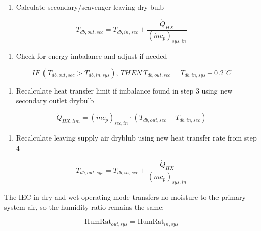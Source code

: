 \begin{enumerate}
\def\labelenumi{\arabic{enumi}.}
\setcounter{enumi}{1}
\tightlist
\item
  Calculate secondary/scavenger leaving dry-bulb
\end{enumerate}

\begin{equation}
T_{db,out,sec} = T_{db,in,sec} + \frac{\dot{Q}_{HX}}{ \left(\dot{m}c_{p}\right)_{sys,in}}
\end{equation}

\begin{enumerate}
\def\labelenumi{\arabic{enumi}.}
\setcounter{enumi}{2}
\tightlist
\item
  Check for energy imbalance and adjust if needed
\end{enumerate}

\begin{equation}
IF~\left(T_{db,out,sec}>T_{db,in,sys}\right),~THEN~T_{db,out,sec} = T_{db,in,sys}-0.2^{\circ}C
\end{equation}

\begin{enumerate}
\def\labelenumi{\arabic{enumi}.}
\setcounter{enumi}{3}
\tightlist
\item
  Recalculate heat transfer limit if imbalance found in step 3 using new secondary outlet drybulb
\end{enumerate}

\begin{equation}
\dot{Q}_{HX,lim} = \left(\dot{m}c_{p}\right)_{sec,in}\cdot \left( T_{db,out,sec}-T_{db,in,sec} \right)
\end{equation}

\begin{enumerate}
\def\labelenumi{\arabic{enumi}.}
\setcounter{enumi}{4}
\tightlist
\item
  Recalculate leaving supply air dryblub using new heat transfer rate from step 4
\end{enumerate}

\begin{equation}
T_{db,out,sys} = T_{db,in,sec} + \frac{\dot{Q}_{HX}}{ \left(\dot{m}c_{p}\right)_{sys,in}}
\end{equation}

The IEC in dry and wet operating mode transfers no moisture to the primary system air, so the humidity ratio remains the same:

\begin{equation}
\text{HumRat}_{out,sys} = \text{HumRat}_{in,sys}
\end{equation}

